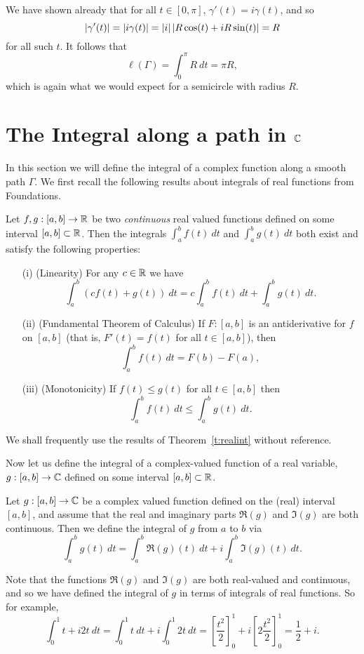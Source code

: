 We have shown already that for all $t\in [0,\pi]$, $\gamma'(t)=i\gamma(t)$, and so
\[
\left| \gamma'(t) \right| = \left| i \gamma (t) \right| = \left| i \right| \left|  R \cos(t)+iR\sin(t) \right| = R
\]
for all such $t$.  It follows that
\[
\ell ( \Gamma ) = \int_0^{\pi} R\ dt = \pi R,
\]
which is again what we would expect for a semicircle with radius $R$.



\section{The Integral along a path in $\mathbb{C}$}
In this section we will define the integral of a complex function along a smooth path $\Gamma$.  We first recall the following results about integrals of real functions from Foundations.
\begin{theorem}
\label{t:realint}
Let $f,g:[a,b] \to \mathbb{R}$ be two \emph{continuous} real valued functions defined on some interval $[a,b] \subset \mathbb{R}$.  Then the integrals $\int_a^b f(t)\ dt$ and $\int_a^b g(t)\ dt$ both exist and satisfy the following properties:
\begin{enumerate}
\item[(i)] (Linearity) For any $c \in \mathbb{R}$ we have
\[
\int_a^b \left( cf(t) +  g(t) \right)\ dt = c\int_a^b f(t)\ dt +  \int_a^b g(t)\ dt.
\]
\item[(ii)] (Fundamental Theorem of Calculus) If $F:[a,b]$ is an antiderivative for $f$ on $[a,b]$ (that is, $F'(t) = f(t)$ for all $t \in [a,b]$), then 
\[
\int_a^b f(t)\ dt = F(b) - F(a),
\]
\item[(iii)] (Monotonicity) If $f(t) \leq g(t)$ for all $t \in [a,b]$ then
\[
\int_a^b f(t)\ dt \leq \int_a^b g(t)\ dt.
\]
\end{enumerate}
\end{theorem}
We shall frequently use the results of Theorem~\ref{t:realint} without reference.

Now let us define the integral of a complex-valued function of a real variable, $g:[a,b] \to \mathbb{C}$ defined on some interval $[a,b] \subset \mathbb{R}$.

\begin{definition}
\label{d:realint}
Let $g:[a,b] \to \mathbb{C}$ be a complex valued function defined on the (real) interval $[a,b]$, and assume that the real and imaginary parts $\Re (g)$ and $\Im (g)$ are both continuous.  Then we define the integral of $g$ from $a$ to $b$ via
\[
\int_a^b g(t)\ dt = \int_a^b \Re (g) (t)\ dt + i \int_a^b \Im (g) (t)\ dt.
\]
\end{definition}
Note that the functions $\Re (g)$ and $\Im (g)$ are both real-valued and continuous, and so we have defined the integral of $g$ in terms of integrals of real functions.  So for example,
\[
\int_0^1 t+i2t\ dt = \int_0^1 t\ dt +i \int_0^1 2t\ dt = \left[ \frac{t^2}{2} \right]_0^1 + i \left[ 2 \frac{t^2}{2} \right]_0^1
= \frac{1}{2}+i.\]

